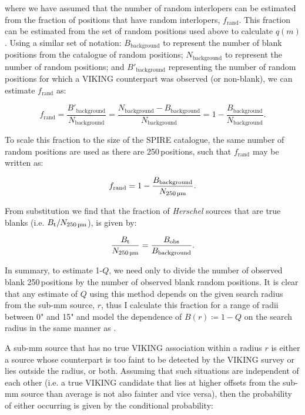 where we have assumed that the number of random interlopers can be estimated from the fraction of positions that have random interlopers, $f_{\textrm{rand}}$. This fraction can be estimated from the set of random positions used above to calculate $q(m)$. Using a similar set of notation: $B_{\textrm{background}}$ to represent the number of blank positions from the catalogue of random positions; $N_{\textrm{background}}$ to represent the number of random positions; and $B'_{\textrm{background}}$ representing the number of random positions for which a VIKING counterpart was observed (or non-blank), we can estimate $f_{\textrm{rand}}$ as:

\begin{equation}
    f_{\textrm{rand}} = \frac{B'_{\textrm{background}}}{N_{\textrm{background}}} = \frac{N_{\textrm{background}} - B_{\textrm{background}}}{N_{\textrm{background}}} = 1 - \frac{B_{\textrm{background}}}{N_{\textrm{background}}}.
\end{equation}

To scale this fraction to the size of the SPIRE catalogue, the same number of random positions are used as there are 250\,\micron positions, such that $f_{\textrm{rand}}$ may be written as:

\begin{equation}
    f_{\textrm{rand}} = 1 - \frac{B_{\textrm{background}}}{N_{\textrm{250\,\micron}}}.
\end{equation}

From substitution we find that the fraction of \textit{Herschel} sources that are true blanks (i.e. $B_{\textrm{t}}/N_{\textrm{250\,\micron}}$), is given by:

\begin{equation}
    \frac{B_{\textrm{t}}}{N_{\textrm{250\,\micron}}} = \frac{B_{\textrm{obs}}}{B_{\textrm{background}}}.
\end{equation}

In summary, to estimate 1-$Q$, we need only to divide the number of observed blank 250\,\micron positions by the number of observed blank random positions. It is clear that any estimate of $Q$ using this method depends on the given search radius from the sub-mm source, $r$, thus I calculate this fraction for a range of radii between 0" and 15" and model the dependence of $B(r) \coloneqq 1 - Q$ on the search radius in the same manner as \citealt{Fleuren_2012}. 

A sub-mm source that has no true VIKING association within a radius $r$ is either a source whose counterpart is too faint to be detected by the VIKING survey or lies outside the radius, or both. Assuming that such situations are independent of each other (i.e. a true VIKING candidate that lies at higher offsets from the sub-mm source than average is not also fainter and vice versa), then the probability of either occurring is given by the conditional probability:

